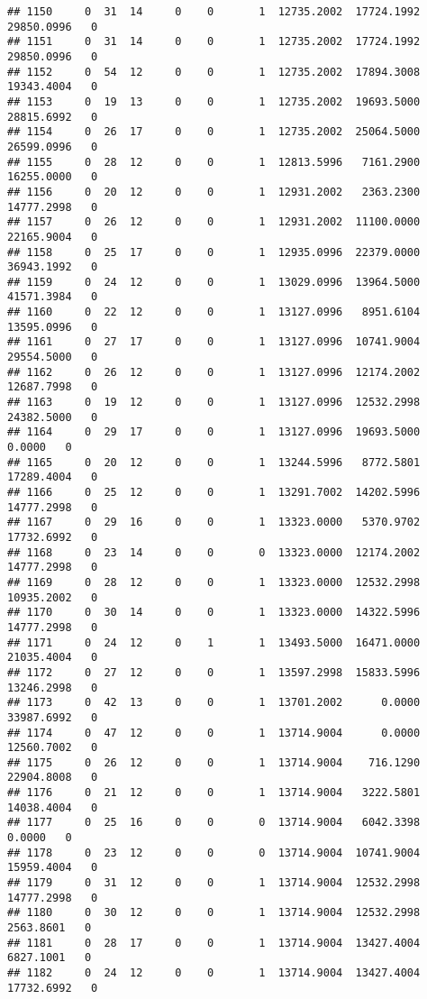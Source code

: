 \documentclass[
]{article}
\begin{document}
\begin{enumerate}
\begin{verbatim}
## 1150     0  31  14     0    0       1  12735.2002  17724.1992  29850.0996   0
## 1151     0  31  14     0    0       1  12735.2002  17724.1992  29850.0996   0
## 1152     0  54  12     0    0       1  12735.2002  17894.3008  19343.4004   0
## 1153     0  19  13     0    0       1  12735.2002  19693.5000  28815.6992   0
## 1154     0  26  17     0    0       1  12735.2002  25064.5000  26599.0996   0
## 1155     0  28  12     0    0       1  12813.5996   7161.2900  16255.0000   0
## 1156     0  20  12     0    0       1  12931.2002   2363.2300  14777.2998   0
## 1157     0  26  12     0    0       1  12931.2002  11100.0000  22165.9004   0
## 1158     0  25  17     0    0       1  12935.0996  22379.0000  36943.1992   0
## 1159     0  24  12     0    0       1  13029.0996  13964.5000  41571.3984   0
## 1160     0  22  12     0    0       1  13127.0996   8951.6104  13595.0996   0
## 1161     0  27  17     0    0       1  13127.0996  10741.9004  29554.5000   0
## 1162     0  26  12     0    0       1  13127.0996  12174.2002  12687.7998   0
## 1163     0  19  12     0    0       1  13127.0996  12532.2998  24382.5000   0
## 1164     0  29  17     0    0       1  13127.0996  19693.5000      0.0000   0
## 1165     0  20  12     0    0       1  13244.5996   8772.5801  17289.4004   0
## 1166     0  25  12     0    0       1  13291.7002  14202.5996  14777.2998   0
## 1167     0  29  16     0    0       1  13323.0000   5370.9702  17732.6992   0
## 1168     0  23  14     0    0       0  13323.0000  12174.2002  14777.2998   0
## 1169     0  28  12     0    0       1  13323.0000  12532.2998  10935.2002   0
## 1170     0  30  14     0    0       1  13323.0000  14322.5996  14777.2998   0
## 1171     0  24  12     0    1       1  13493.5000  16471.0000  21035.4004   0
## 1172     0  27  12     0    0       1  13597.2998  15833.5996  13246.2998   0
## 1173     0  42  13     0    0       1  13701.2002      0.0000  33987.6992   0
## 1174     0  47  12     0    0       1  13714.9004      0.0000  12560.7002   0
## 1175     0  26  12     0    0       1  13714.9004    716.1290  22904.8008   0
## 1176     0  21  12     0    0       1  13714.9004   3222.5801  14038.4004   0
## 1177     0  25  16     0    0       0  13714.9004   6042.3398      0.0000   0
## 1178     0  23  12     0    0       0  13714.9004  10741.9004  15959.4004   0
## 1179     0  31  12     0    0       1  13714.9004  12532.2998  14777.2998   0
## 1180     0  30  12     0    0       1  13714.9004  12532.2998   2563.8601   0
## 1181     0  28  17     0    0       1  13714.9004  13427.4004   6827.1001   0
## 1182     0  24  12     0    0       1  13714.9004  13427.4004  17732.6992   0

\end{verbatim}
\end{enumerate}
\end{document}
